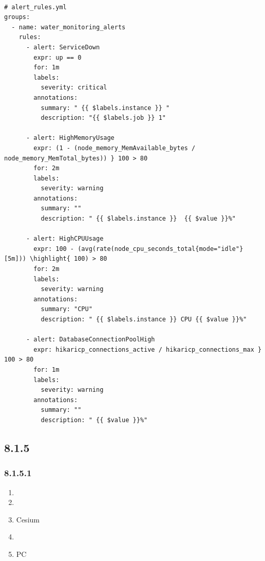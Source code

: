 \hypertarget{section-53}{%
\paragraph{}\label{section-53}}

\begin{lstlisting}
# alert_rules.yml
groups:
  - name: water_monitoring_alerts
    rules:
      - alert: ServiceDown
        expr: up == 0
        for: 1m
        labels:
          severity: critical
        annotations:
          summary: " {{ $labels.instance }} "
          description: "{{ $labels.job }} 1"

      - alert: HighMemoryUsage
        expr: (1 - (node_memory_MemAvailable_bytes / node_memory_MemTotal_bytes)) } 100 > 80
        for: 2m
        labels:
          severity: warning
        annotations:
          summary: ""
          description: " {{ $labels.instance }}  {{ $value }}%"

      - alert: HighCPUUsage
        expr: 100 - (avg(rate(node_cpu_seconds_total{mode="idle"}[5m])) \highlight{ 100) > 80
        for: 2m
        labels:
          severity: warning
        annotations:
          summary: "CPU"
          description: " {{ $labels.instance }} CPU {{ $value }}%"

      - alert: DatabaseConnectionPoolHigh
        expr: hikaricp_connections_active / hikaricp_connections_max } 100 > 80
        for: 1m
        labels:
          severity: warning
        annotations:
          summary: ""
          description: " {{ $value }}%"
\end{lstlisting}

\hypertarget{section-54}{%
\subsection{8.1.5}\label{section-54}}

\hypertarget{section-55}{%
\subsubsection{8.1.5.1}\label{section-55}}

\begin{enumerate}
\def\labelenumi{\arabic{enumi}.}
\item
  \important{}
\item
  \important{}
\item
  \important{}Cesium
\item
  \important{}
\item
  \important{}PC
\end{enumerate}


